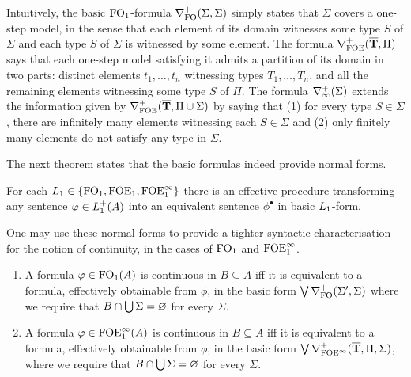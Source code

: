 Intuitively, the basic $\ofo$-formula $\posdgbnfofo{\Sigma}{\Sigma}$ simply 
states that $\Sigma$ covers a one-step model, in the sense that each element of
its domain witnesses some type $S$ of $\Sigma$ and each type $S$ of $\Sigma$ is 
witnessed by some element.
The formula $\posdbnfofoe{\vlist{T}}{\Pi}$ says that each one-step
model satisfying it admits a partition of its domain in two parts: distinct 
elements $t_1,\dots,t_n$ witnessing types $T_1,\dots,T_n$, and all the remaining
elements witnessing some type $S$ of $\Pi$.  
The formula $\posdbnfinf{\Sigma}$ extends the information given by
$\posdbnfofoe{\vlist{T}}{\Pi \cup \Sigma}$ by saying that (1) for every type 
$S\in\Sigma$, there are infinitely many elements witnessing each $S \in \Sigma$
and (2) only finitely many elements do not satisfy any type in $\Sigma$. 

The next theorem states that the basic formulas indeed provide normal forms.

\begin{theorem}  
\label{t:osnf}
For each $\oslang \in \{\ofo, \ofoe,\ofoei \}$ there is an effective procedure 
transforming any sentence $\phi \in \oslang^{+}(A)$ into an equivalent
sentence $\phi^{\bullet}$ in basic $\oslang$-form.
\end{theorem}

One may use these normal forms to provide a tighter syntactic characterisation
for the notion of continuity, in the cases of $\ofo$ and $\ofoei$.

\begin{theorem}  
\label{t:osnf-cont}
\begin{enumerate}

\item 
A formula $\phi \in \ofo(A)$ is continuous in $B \subseteq A$ iff it is
equivalent to a formula, effectively obtainable from $\phi$, in the basic form 
$\bigvee \posdgbnfofo{\Sigma'}{\Sigma}$ 
where we require that $B \cap \bigcup\Sigma = \nada$ for every $\Sigma$.

\item A formula $\phi \in \ofoei(A)$ is continuous in $B \subseteq A$ iff it is
equivalent to a formula, effectively obtainable from $\phi$, in the basic form 
$\bigvee \mondbnfofoei{\vlist{T}}{\Pi}{\Sigma}{+}$, 
where we require that $B \cap \bigcup\Sigma = \nada$ for every $\Sigma$.
\end{enumerate}
\end{theorem}


